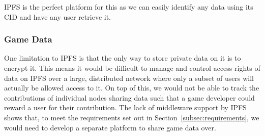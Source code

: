 \vspace{2mm}\noindent
IPFS is the perfect platform for this as we can easily identify any data using its CID and have any user retrieve it.

\subsubsection*{Game Data}

One limitation to IPFS is that the only way to store private data on it is to encrypt it. This means it would be difficult to manage and control access rights of data on IPFS over a large, distributed network where only a subset of users will actually be allowed access to it. 
On top of this, we would not be able to track the contributions of individual nodes sharing data such that a game developer could reward a user for their contribution. 
The lack of middleware support by IPFS shows that, to meet the requirements set out in Section~\ref{subsec:requirements}, we would need to develop a separate platform to share game data over. 

